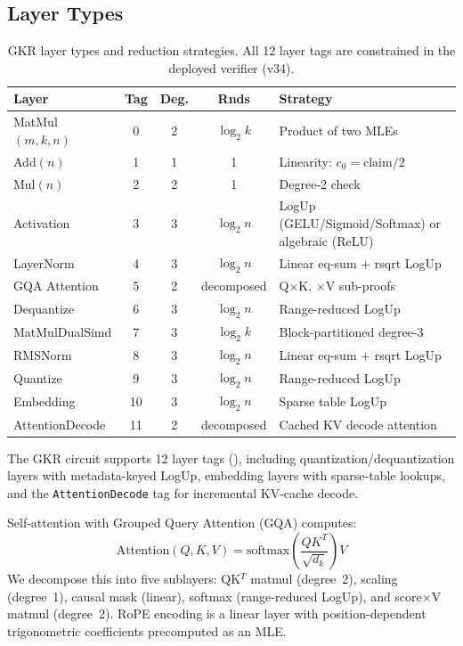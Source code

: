\documentclass[10pt,twocolumn]{article}
\theoremstyle{definition}
\theoremstyle{remark}
\begin{document}
\subsection{Layer Types}

\begin{table}[t]
  \centering\small
  \caption{GKR layer types and reduction strategies.
           All 12 layer tags are constrained in the deployed verifier (v34).}
  \label{tab:layers}
  \begin{tabularx}{\columnwidth}{@{}lcccX@{}}
    \toprule
    \textbf{Layer} & \textbf{Tag} & \textbf{Deg.} & \textbf{Rnds} & \textbf{Strategy} \\
    \midrule
    MatMul$(m,k,n)$     & 0 & 2 & $\log_2 k$ & Product of two MLEs \\
    Add$(n)$            & 1 & 1 & 1          & Linearity: $c_0=\text{claim}/2$ \\
    Mul$(n)$            & 2 & 2 & 1          & Degree-2 check \\
    Activation          & 3 & 3 & $\log_2 n$ & LogUp (GELU/Sigmoid/Softmax) or algebraic (ReLU) \\
    LayerNorm           & 4 & 3 & $\log_2 n$ & Linear eq-sum + rsqrt LogUp \\
    GQA Attention       & 5 & 2 & decomposed & Q$\times$K, $\times$V sub-proofs \\
    Dequantize          & 6 & 3 & $\log_2 n$ & Range-reduced LogUp \\
    MatMulDualSimd      & 7 & 3 & $\log_2 k$ & Block-partitioned degree-3 \\
    RMSNorm             & 8 & 3 & $\log_2 n$ & Linear eq-sum + rsqrt LogUp \\
    Quantize            & 9 & 3 & $\log_2 n$ & Range-reduced LogUp \\
    Embedding           & 10 & 3 & $\log_2 n$ & Sparse table LogUp \\
    AttentionDecode     & 11 & 2 & decomposed & Cached KV decode attention \\
    \bottomrule
  \end{tabularx}
\end{table}

The GKR circuit supports 12 layer tags (),
including quantization/dequantization layers with metadata-keyed
LogUp, embedding layers with sparse-table lookups, and the
\texttt{AttentionDecode} tag for incremental KV-cache decode.

Self-attention with Grouped Query Attention
(GQA) computes:
\[
  \text{Attention}(Q,K,V)
  = \text{softmax}\!\left(\frac{QK^T}{\sqrt{d_k}}\right)\!V
\]
We decompose this into five sublayers: QK$^T$ matmul (degree~2),
scaling (degree~1), causal mask (linear), softmax (range-reduced LogUp),
and score$\times$V matmul (degree~2).
RoPE encoding is a linear layer with position-dependent trigonometric
coefficients precomputed as an MLE.
\end{document}
